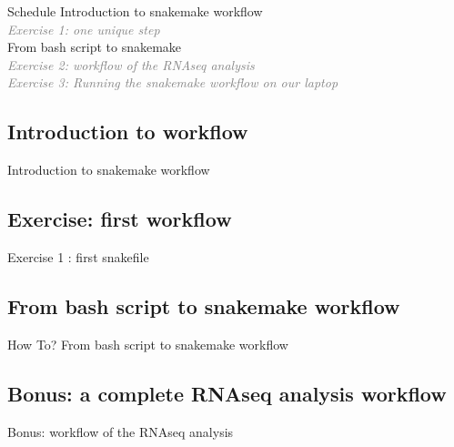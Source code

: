 
\begin{frame}{Schedule}
Introduction to snakemake workflow\\
\quad \quad \textcolor{gray}{\it Exercise 1: one unique step}\\
From bash script to snakemake\\
\quad \quad \textcolor{gray}{\it Exercise 2: workflow of the RNAseq analysis}\\
\quad \quad \textcolor{gray}{\it Exercise 3: Running the snakemake workflow on our laptop}\\
\end{frame}

\subsection[WorkflowIntro]{Introduction to workflow}
\begin{frame}{}
    \huge{Introduction to snakemake workflow}
\end{frame}


\subsection[SnakemakeEx1]{Exercise: first workflow}
\begin{frame}{}
    \huge{Exercise 1 : first snakefile}
\end{frame}


\subsection[bash2snakemake]{From bash script to snakemake workflow}
\begin{frame}{How To?}
    \huge{From bash script to snakemake workflow}
\end{frame}


\subsection[SnakemakeEx2]{Bonus: a complete RNAseq analysis workflow}
\begin{frame}{}
    \huge{Bonus: workflow of the RNAseq analysis}
\end{frame}



